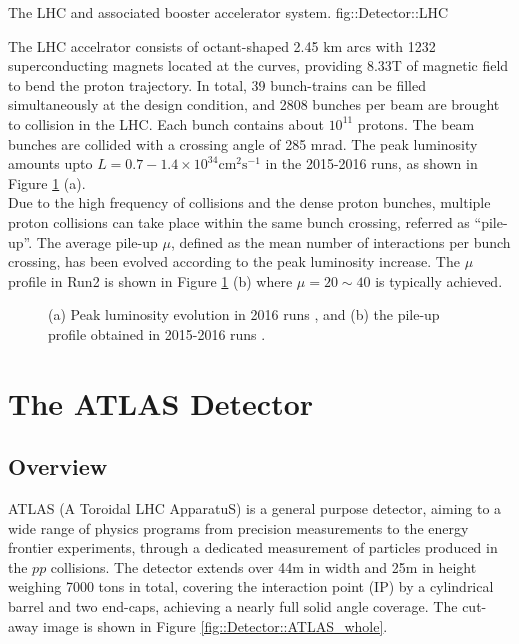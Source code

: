{The LHC and associated booster accelerator system. \cite{LHCPhoto}}
{fig::Detector::LHC}

The LHC accelrator consists of octant-shaped 2.45 km arcs with 1232 superconducting magnets located at the curves, providing 8.33T of magnetic field to bend the proton trajectory.
In total, 39 bunch-trains can be filled simultaneously at the design condition, and 2808 bunches per beam are brought to collision in the LHC. Each bunch contains about $10^{11}$ protons. 
The beam bunches are collided with a crossing angle of 285 mrad. 
The peak luminosity amounts upto $L = 0.7-1.4 \times 10^{34} \mathrm{cm}^{2} \mathrm{s}^{-1}$ in the 2015-2016 runs, as shown in Figure \ref{fig::Detector::DAQ} (a). \\

Due to the high frequency of collisions and the dense proton bunches, multiple proton collisions can take place within the same bunch crossing, referred as ``pile-up''. 
The average pile-up $\mu$, defined as the mean number of interactions per bunch crossing,  
has been evolved according to the peak luminosity increase. 
The $\mu$ profile in Run2 is shown in Figure \ref{fig::Detector::DAQ} (b) where $\mu = 20\sim40$ is typically achieved. 

\begin{figure}[h]
  \centering
    \caption{  (a) Peak luminosity evolution in 2016 runs \cite{DAQ2016}, and (b) the pile-up profile obtained in 2015-2016 runs  \cite{lumiPubResult}.
      \label{fig::Detector::DAQ}
    }
\end{figure}


\clearpage



\section{The ATLAS Detector}
\subsection{Overview}
ATLAS (A Toroidal LHC ApparatuS) is a general purpose detector, 
aiming to a wide range of physics programs from precision measurements to the energy frontier experiments, 
through a dedicated measurement of particles produced in the $pp$ collisions. 
The detector extends over 44m in width and 25m in height weighing 7000 tons in total, covering the interaction point (IP) by a cylindrical barrel and two end-caps, 
achieving a nearly full solid angle coverage. 
%
The cut-away image is shown in Figure \ref{fig::Detector::ATLAS_whole}. \\

